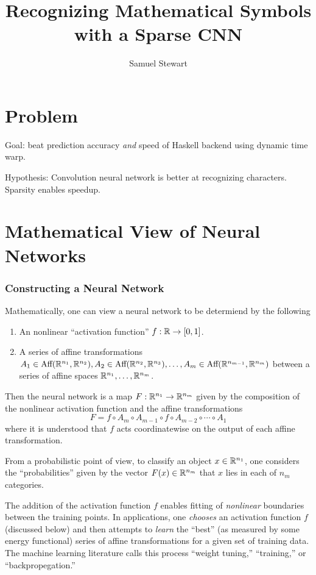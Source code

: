 \documentclass[12pt,letterpaper,boxed]{article}
\author{Samuel Stewart}
\title{Recognizing Mathematical Symbols with a Sparse CNN}
\begin{document}
\section{Problem}
	Goal: beat prediction accuracy \emph{and} speed of Haskell backend using dynamic time warp.

	Hypothesis: Convolution neural network is better at recognizing characters. Sparsity enables speedup.

\section{Mathematical View of Neural Networks}

	\subsubsection{Constructing a Neural Network}

	Mathematically, one can view a neural network to be determiend by the following
	\begin{enumerate}
		\item An nonlinear ``activation function'' $f : {\mathbb{R}} \to [0, 1]$.
		\item A series of affine transformations 
		$A_1 \in \textrm{Aff}({\mathbb{R}}^{n_1}, {\mathbb{R}}^{n_2}), A_2 \in \textrm{Aff}({\mathbb{R}}^{n_2}, {\mathbb{R}}^{n_3}), \ldots, A_m \in \textrm{Aff}({\mathbb{R}}^{n_{m - 1}}, {\mathbb{R}}^{n_m})$
		between a series of affine spaces ${\mathbb{R}}^{n_1}, \ldots, {\mathbb{R}}^{n_m}$.
	\end{enumerate}
	Then the neural network is a map $F : {\mathbb{R}}^{n_1} \to {\mathbb{R}}^{n_m}$ given by the composition of the nonlinear activation function and the affine transformations
	\[
		F = f \circ A_m \circ A_{m - 1} \circ f \circ A_{m - 2} \circ \cdots \circ A_1
	\]
	where it is understood that $f$ acts coordinatewise on the output of each affine transformation. 

	From a probabilistic point of view, to classify an object $x \in {\mathbb{R}}^{n_1}$, one considers the ``probabilities'' given by the vector $F(x) \in {\mathbb{R}}^{n_m}$ that $x$ lies in each of $n_m$ categories. 

	The addition of the activation function $f$ enables fitting of \textit{nonlinear} boundaries between the training points. In applications, one \textit{chooses} an activation function $f$ (discussed below) and then attempts to \textit{learn} the ``best'' (as measured by some energy functional) series of affine transformations for a given set of training data. The machine learning literature calls this process ``weight tuning,'' ``training,'' or ``backpropegation.''
\end{document}
